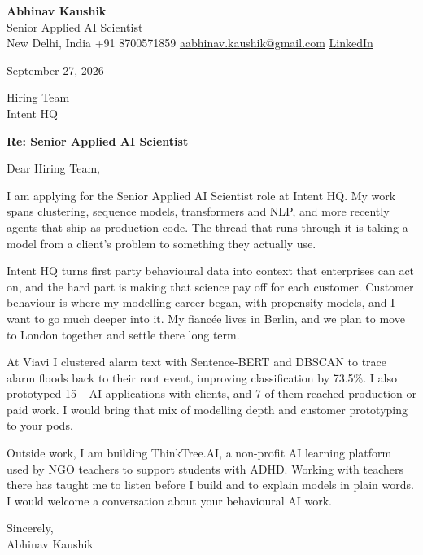 \documentclass[11pt,a4paper]{article}
\begin{document}
{\Large\bfseries Abhinav Kaushik}\\
Senior Applied AI Scientist\\
New Delhi, India \textbar{} +91 8700571859 \textbar{} \href{mailto:aabhinav.kaushik@gmail.com}{aabhinav.kaushik@gmail.com} \textbar{} \href{https://www.linkedin.com/in/abhinav-kaushik10/}{LinkedIn}  

September 27, 2026

Hiring Team\\
Intent HQ

\textbf{Re: Senior Applied AI Scientist}

Dear Hiring Team,

I am applying for the Senior Applied AI Scientist role at Intent HQ. My work spans clustering, sequence models, transformers and NLP, and more recently agents that ship as production code. The thread that runs through it is taking a model from a client's problem to something they actually use.

Intent HQ turns first party behavioural data into context that enterprises can act on, and the hard part is making that science pay off for each customer. Customer behaviour is where my modelling career began, with propensity models, and I want to go much deeper into it. My fiancée lives in Berlin, and we plan to move to London together and settle there long term.

At Viavi I clustered alarm text with Sentence-BERT and DBSCAN to trace alarm floods back to their root event, improving classification by 73.5\%. I also prototyped 15+ AI applications with clients, and 7 of them reached production or paid work. I would bring that mix of modelling depth and customer prototyping to your pods.

Outside work, I am building ThinkTree.AI, a non-profit AI learning platform used by NGO teachers to support students with ADHD. Working with teachers there has taught me to listen before I build and to explain models in plain words. I would welcome a conversation about your behavioural AI work.

Sincerely,\\[4pt]
Abhinav Kaushik
\end{document}
